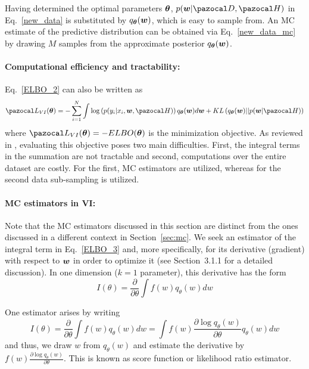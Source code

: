 Having determined the optimal parameters $\boldsymbol{\theta}$, $p(\bw|\cD, \cH)$ in Eq.~\eqref{new_data} is substituted by $q_{\boldsymbol{\theta}}(\boldsymbol{w})$, which is easy to sample from. 
An MC estimate of the predictive distribution can be obtained via Eq.~\eqref{new_data_mc} by drawing $M$ samples from the approximate posterior $q_{\boldsymbol{\theta}}(\boldsymbol{w})$.

\paragraph{Computational efficiency and tractability:}
Eq.~\eqref{ELBO_2} can also be written as
\begin{equation}\label{ELBO_3}
\cL_{VI}(\bth) = -\sum_{i=1}^{N}\int \log\left(p(y_i|x_i,\bw,\cH)\right)q_{\bth}(\bw) d\bw + KL\left(q_{\bth}(\bw)||p(\bw|\cH)\right)
\end{equation}
where $\cL_{VI}(\bth) = -ELBO(\bth)$ is the minimization objective. 
As reviewed in \textcite{gal2016uncertainty}, evaluating this objective poses two main difficulties. 
First, the integral terms in the summation are not tractable and second, computations over the entire dataset are costly. 
For the first, MC estimators are utilized, whereas for the second data sub-sampling is utilized. 

\paragraph{MC estimators in VI:}\label{sec:mc:vi}
Note that the MC estimators discussed in this section are distinct from the ones discussed in a different context in Section~\ref{sec:mc}.
We seek an estimator of the integral term in Eq.~\eqref{ELBO_3} and, more specifically, for its derivative (gradient) with respect to $\boldsymbol{w}$ in order to optimize it (see \cite{gal2016uncertainty} Section~3.1.1 for a detailed discussion). 
In one dimension ($k=1$ parameter), this derivative has the form 
\begin{equation}
	I(\theta) = \frac{\partial}{\partial \theta} \int f(w)q_{\theta}(w)dw
\end{equation}

One estimator arises by writing 
\begin{equation}
I(\theta) = \frac{\partial}{\partial \theta} \int f(w)q_{\theta}(w)dw=
\int f(w)\frac{\partial \log q_{\theta}(w)}{\partial \theta} q_{\theta}(w)dw
\end{equation}
and thus, we draw $w$ from $q_{\theta}(w)$ and estimate the derivative by $f(w)\frac{\partial \log q_{\theta}(w)}{\partial \theta}$. 
This is known as score function or likelihood ratio estimator.

